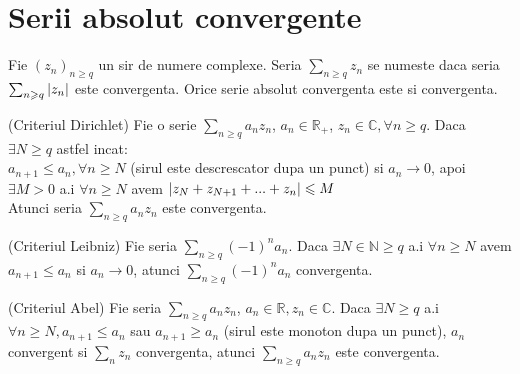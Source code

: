 \documentclass{article}
\begin{document}
\section{Serii absolut convergente}
\begin{enumerate}

   Fie $(z_n)_{n \geq q}$ un sir de numere complexe. Seria $\sum_{n \geq q} z_n$ se numeste  daca seria $\sum_{n \geqslant q} \left\lvert z_n \right\rvert$ este convergenta.
  \propozitie Orice serie absolut convergenta este si convergenta.

  \propozitie (Criteriul Dirichlet) Fie o serie $\sum_{n \geq q} a_n z_n$,  $a_n \in \mathbb{R}_+$,  $z_n \in \mathbb{C}, \forall n \geq q$. Daca $\exists N \geq q$ astfel incat: \\ $a_{n+1} \leq a_n, \forall n \geq N$ (sirul este descrescator dupa un punct) si $a_n \to 0$, apoi \\ $\exists M > 0$ a.i $\forall n \geq N$ avem $\left\lvert z_N + z_{N+1} + ... + z_{n} \right\rvert \leqslant M$ \\
Atunci seria $\sum_{n \geq q} a_n z_n$ este convergenta.
  
\begin{tcolorbox}
\propozitie (Criteriul Leibniz) Fie seria $\sum_{n \geq q} (-1)^n a_n$. Daca $\exists N \in \mathbb{N} \geq q$ a.i $\forall n \geq N$ avem $a_{n+1} \leq a_n$ si $a_n \to 0$, atunci $\sum_{n \geq q} (-1)^n a_n$ convergenta.
\end{tcolorbox}

\begin{tcolorbox}
\propozitie (Criteriul Abel) Fie seria $\sum_{n \geq q} a_n z_n$, $a_n \in \mathbb{R}, z_n \in \mathbb{C}$. Daca $\exists N \geq q$ a.i $\forall n \geq N, a_{n+1} \leq a_n$ sau $a_{n+1} \geq a_n$ (sirul este monoton dupa un punct), $a_n$ convergent si $\sum_{n} z_n$ convergenta, atunci $\sum_{n \geq q} a_n z_n$ este convergenta.
\end{tcolorbox}


  

\end{enumerate}
\end{document}
